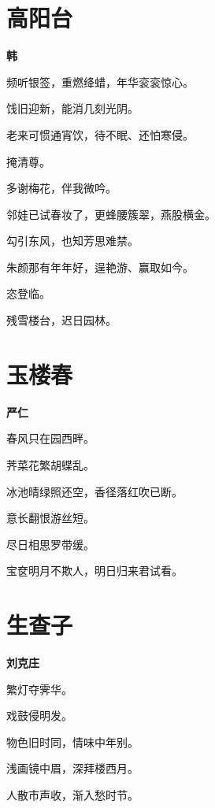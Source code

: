 \documentclass[12pt,a4paper]{ctexbook}
\begin{document}
\section{高阳台}
\textbf{韩}\par\vspace{0.5em}
频听银签，重燃绛蜡，年华衮衮惊心。\par
饯旧迎新，能消几刻光阴。\par
老来可惯通宵饮，待不眠、还怕寒侵。\par
掩清尊。\par
多谢梅花，伴我微吟。\par
邻娃已试春妆了，更蜂腰簇翠，燕股横金。\par
勾引东风，也知芳思难禁。\par
朱颜那有年年好，逞艳游、赢取如今。\par
恣登临。\par
残雪楼台，迟日园林。\par

\section{玉楼春}
\textbf{严仁}\par\vspace{0.5em}
春风只在园西畔。\par
荠菜花繁胡蝶乱。\par
冰池晴绿照还空，香径落红吹已断。\par
意长翻恨游丝短。\par
尽日相思罗带缓。\par
宝奁明月不欺人，明日归来君试看。\par

\section{生查子}
\textbf{刘克庄}\par\vspace{0.5em}
繁灯夺霁华。\par
戏鼓侵明发。\par
物色旧时同，情味中年别。\par
浅画镜中眉，深拜楼西月。\par
人散市声收，渐入愁时节。\par
\end{document}
